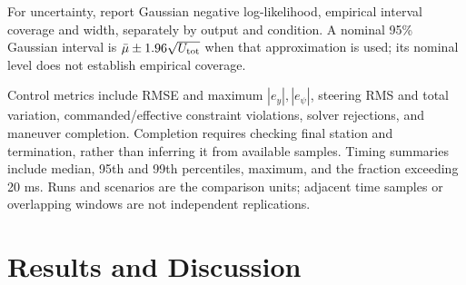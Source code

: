 \documentclass[10pt,journal]{IEEEtran}
\begin{document}
For uncertainty, report Gaussian negative log-likelihood, empirical interval coverage and width, separately by output and condition. A nominal 95\% Gaussian interval is $\bar\mu\pm1.96\sqrt{U_{\rm tot}}$ when that approximation is used; its nominal level does not establish empirical coverage.

Control metrics include RMSE and maximum $|e_y|,|e_\psi|$, steering RMS and total variation, commanded/effective constraint violations, solver rejections, and maneuver completion. Completion requires checking final station and termination, rather than inferring it from available samples. Timing summaries include median, 95th and 99th percentiles, maximum, and the fraction exceeding 20 ms. Runs and scenarios are the comparison units; adjacent time samples or overlapping windows are not independent replications.

%
%

\section{Results and Discussion}
\label{sec:results}
\end{document}
